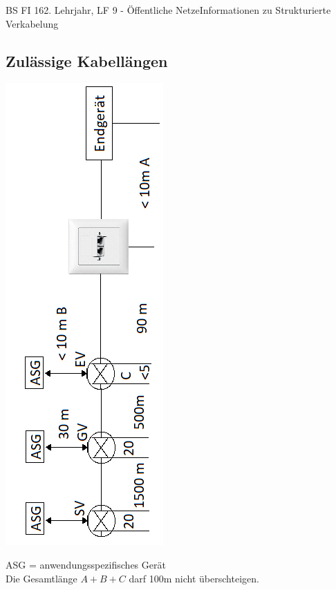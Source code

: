 \documentclass[11pt,twocolumn,oneside,openany,headings=optiontotoc,11pt,numbers=noenddot]{article}
\begin{document}
\begin{worksheet}{BS FI 16}{2. Lehrjahr, LF 9 - Öffentliche Netze}{Informationen zu \glqq{}Strukturierte Verkabelung\grqq{}}
		\subsection*{Zulässige Kabellängen}
		\begin{center}
			\includegraphics[scale=1.3]{Bilder/Kabellaenge2.png}
		\end{center}
		ASG = anwendungsspezifisches Gerät\\
		Die Gesamtlänge \(A + B + C\) darf 100m nicht überschteigen.\\
	\end{worksheet}
\end{document}
